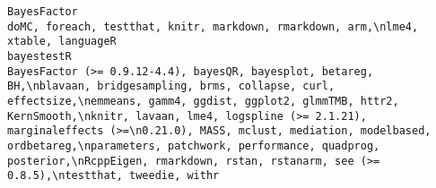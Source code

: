 \documentclass[
  letterpaper,
  DIV=11,
  numbers=noendperiod]{scrreprt}
\begin{document}
\begin{verbatim}
BayesFactor                                                                                                                                                                                                                                                                                                                                                                                                                                                                                                                                                                                                                                                                                                                                                                                                                                                                                                                                                                                                                                                                                                                                                                                                                doMC, foreach, testthat, knitr, markdown, rmarkdown, arm,\nlme4, xtable, languageR
bayestestR                                                                                                                                                                                                                                                                                                                                                                                                                                                                                                                                                                                                                                                                                                                                                                                                                                    BayesFactor (>= 0.9.12-4.4), bayesQR, bayesplot, betareg, BH,\nblavaan, bridgesampling, brms, collapse, curl, effectsize,\nemmeans, gamm4, ggdist, ggplot2, glmmTMB, httr2, KernSmooth,\nknitr, lavaan, lme4, logspline (>= 2.1.21), marginaleffects (>=\n0.21.0), MASS, mclust, mediation, modelbased, ordbetareg,\nparameters, patchwork, performance, quadprog, posterior,\nRcppEigen, rmarkdown, rstan, rstanarm, see (>= 0.8.5),\ntestthat, tweedie, withr

\end{verbatim}
\end{document}
